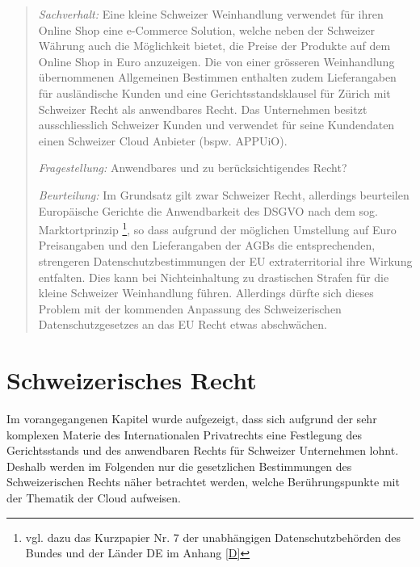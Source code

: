 \documentclass[a4paper,pointlessnumbers]{scrreprt}
\begin{document}
\begin{quote}
\textit{Sachverhalt:} Eine kleine Schweizer Weinhandlung verwendet für ihren Online Shop eine e-Commerce Solution, welche neben der Schweizer Währung auch die Möglichkeit bietet, die Preise der Produkte auf dem Online Shop in Euro anzuzeigen. Die von einer grösseren Weinhandlung übernommenen Allgemeinen Bestimmen enthalten zudem Lieferangaben für ausländische Kunden und eine Gerichtsstandsklausel für Zürich mit Schweizer Recht als anwendbares Recht. Das Unternehmen besitzt ausschliesslich Schweizer Kunden und verwendet für seine Kundendaten einen Schweizer Cloud Anbieter (bspw. APPUiO).

\textit{Fragestellung:} Anwendbares und zu berücksichtigendes Recht?

\textit{Beurteilung:} Im Grundsatz gilt zwar Schweizer Recht, allerdings beurteilen Europäische Gerichte die Anwendbarkeit des DSGVO nach dem sog. Marktortprinzip \footnote{vgl. dazu das Kurzpapier Nr. 7 der unabhängigen Datenschutzbehörden des Bundes und der Länder DE im Anhang \ref{D}}, so dass aufgrund der möglichen Umstellung auf Euro Preisangaben und den Lieferangaben der AGBs die entsprechenden, strengeren Datenschutzbestimmungen der EU extraterritorial ihre Wirkung entfalten. Dies kann bei Nichteinhaltung zu drastischen Strafen für die kleine Schweizer Weinhandlung führen. Allerdings dürfte sich dieses Problem mit der kommenden Anpassung des Schweizerischen Datenschutzgesetzes an das EU Recht etwas abschwächen.
\end{quote}


\chapter{Schweizerisches Recht}
Im vorangegangenen Kapitel wurde aufgezeigt, dass sich aufgrund der sehr komplexen Materie des Internationalen Privatrechts eine Festlegung des Gerichtsstands und des anwendbaren Rechts für Schweizer Unternehmen lohnt. Deshalb werden im Folgenden nur die gesetzlichen Bestimmungen des Schweizerischen Rechts näher betrachtet werden, welche Berührungspunkte mit der Thematik der Cloud aufweisen.
\end{document}
